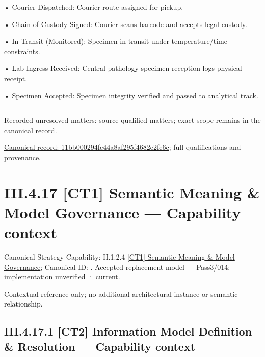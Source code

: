 •
Courier Dispatched: Courier route assigned for pickup.



•
Chain-of-Custody Signed: Courier scans barcode and accepts legal custody.



•
In-Transit (Monitored): Specimen in transit under temperature/time constraints.



•
Lab Ingress Received: Central pathology specimen reception logs physical receipt.



•
Specimen Accepted: Specimen integrity verified and passed to analytical track.



\medskip\hrule\medskip

{\small Recorded unresolved matters: source-qualified matters; exact scope remains in the canonical record.}\par
{\footnotesize \href{../../../../continuum/business/business-process/11bb000294fc44a8af295f4682e2fe6c.md}{Canonical record: 11bb000294fc44a8af295f4682e2fe6c}; full qualifications and provenance.}\par
\section*{III.4.17 [CT1] Semantic Meaning \& Model Governance — Capability context}
\label{navigation:III.4.17}

{\small Canonical Strategy Capability: II.1.2.4 \hyperref[element:cc25d325f7104ccda137cbf6ee371fb3]{[CT1] Semantic Meaning \& Model Governance}; Canonical ID: \texttt{}. Accepted replacement model — Pass3/014; implementation unverified · current.}\par
Contextual reference only; no additional architectural instance or semantic relationship.\par
\subsection*{III.4.17.1 [CT2] Information Model Definition \& Resolution — Capability context}
\label{navigation:III.4.17.1}

